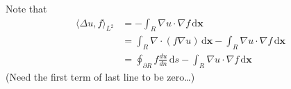 \documentclass[a4paper]{article}
\newcommand{\dxx}{\, \text{d} \mathbf{x}}
\theoremstyle{definition}
\begin{document}
Note that
\begin{align}
    \langle \Delta u, f \rangle_{L^2} &= - \int_R \nabla u \cdot \nabla f \dxx \\
    &= \int_R \nabla \cdot \left( f \nabla u \right) \dxx - \int_R \nabla u \cdot \nabla f \dxx \\
    &= \oint_{\partial R} f \frac{du}{dn} \, \text{d} s - \int_R \nabla u \cdot \nabla f \dxx
\end{align}
(Need the first term of last line to be zero\dots)
\end{document}
